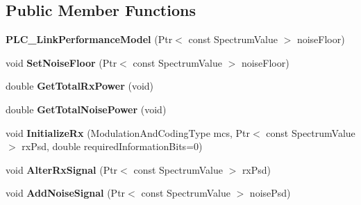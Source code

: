 \subsection*{\-Public \-Member \-Functions}
\begin{DoxyCompactItemize}
\item 
\hypertarget{classns3_1_1PLC__LinkPerformanceModel_a68e2d733c273b6b6eb02c85d9f95187f}{{\bfseries \-P\-L\-C\-\_\-\-Link\-Performance\-Model} (\-Ptr$<$ const \-Spectrum\-Value $>$ noise\-Floor)}\label{classns3_1_1PLC__LinkPerformanceModel_a68e2d733c273b6b6eb02c85d9f95187f}

\item 
\hypertarget{classns3_1_1PLC__LinkPerformanceModel_a561ad30d6f8aafc990d44625de6fff0a}{void {\bfseries \-Set\-Noise\-Floor} (\-Ptr$<$ const \-Spectrum\-Value $>$ noise\-Floor)}\label{classns3_1_1PLC__LinkPerformanceModel_a561ad30d6f8aafc990d44625de6fff0a}

\item 
\hypertarget{classns3_1_1PLC__LinkPerformanceModel_acf1382a18105c5b80d6d1930f744580f}{double {\bfseries \-Get\-Total\-Rx\-Power} (void)}\label{classns3_1_1PLC__LinkPerformanceModel_acf1382a18105c5b80d6d1930f744580f}

\item 
\hypertarget{classns3_1_1PLC__LinkPerformanceModel_a24de3e14596295447cc1aaa3a5195f8b}{double {\bfseries \-Get\-Total\-Noise\-Power} (void)}\label{classns3_1_1PLC__LinkPerformanceModel_a24de3e14596295447cc1aaa3a5195f8b}

\item 
\hypertarget{classns3_1_1PLC__LinkPerformanceModel_a150ad47c334385a8e6b17be6745b704e}{void {\bfseries \-Initialize\-Rx} (\-Modulation\-And\-Coding\-Type mcs, \-Ptr$<$ const \-Spectrum\-Value $>$ rx\-Psd, double required\-Information\-Bits=0)}\label{classns3_1_1PLC__LinkPerformanceModel_a150ad47c334385a8e6b17be6745b704e}

\item 
\hypertarget{classns3_1_1PLC__LinkPerformanceModel_a7113925786b2ad9ebc4c36112b4ce642}{void {\bfseries \-Alter\-Rx\-Signal} (\-Ptr$<$ const \-Spectrum\-Value $>$ rx\-Psd)}\label{classns3_1_1PLC__LinkPerformanceModel_a7113925786b2ad9ebc4c36112b4ce642}

\item 
\hypertarget{classns3_1_1PLC__LinkPerformanceModel_a144e9bfde78d92976861615e4604c654}{void {\bfseries \-Add\-Noise\-Signal} (\-Ptr$<$ const \-Spectrum\-Value $>$ noise\-Psd)}\label{classns3_1_1PLC__LinkPerformanceModel_a144e9bfde78d92976861615e4604c654}


\end{DoxyCompactItemize}
